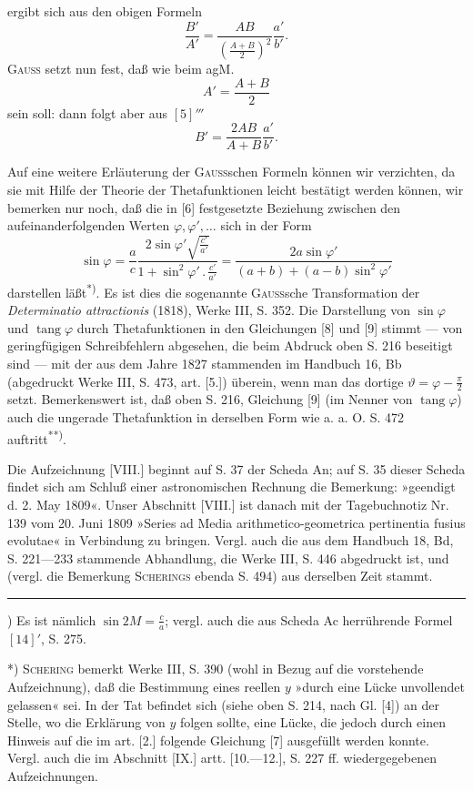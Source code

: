\noindent ergibt sich aus den obigen Formeln
\begin{equation*}\tag*{$[5]'''$}\frac{B'}{A'}=\frac{AB}{\left(\frac{A+B}2\right)^2}\frac{a'}{b'}.\end{equation*}
\noindent \textsc{Gauss} setzt nun fest, daß wie beim agM.
\[A'=\frac{A+B}2\]
\noindent sein soll: dann folgt aber aus $[5]'''$
\[B'=\frac{2AB}{A+B}\frac{a'}{b'}.\]
\par\indent Auf eine weitere Erläuterung der \textsc{Gauss}schen Formeln können wir verzichten, da sie mit Hilfe der Theorie der Thetafunktionen leicht bestätigt werden können, wir bemerken nur noch, daß die in [6] festgesetzte Beziehung zwischen den aufeinanderfolgenden Werten $\varphi,\varphi',\ldots$ sich in der Form
\begin{equation*}\tag*{$[6]'$}
\sin\varphi=\frac ac\frac{2\sin\varphi'\sqrt{\frac{c'}{a'}}}{1+\sin^2\varphi'\,.\,\frac{c'}{a'}}=\frac{2a\sin\varphi'}{(a+b)+(a-b)\sin^2\varphi'}
\end{equation*}
\noindent darstellen läßt\textsuperscript{*)}. Es ist dies die sogenannte \textsc{Gauss}sche Transformation der \textit{Determinatio attractionis} (1818), Werke III, S. 352. Die Darstellung von $\sin\varphi$ und $\operatorname{tang}\varphi$ durch Thetafunktionen in den Gleichungen [8] und [9] stimmt — von geringfügigen Schreibfehlern abgesehen, die beim Abdruck oben S. 216 beseitigt sind — mit der aus dem Jahre 1827 stammenden im Handbuch 16, Bb (abgedruckt Werke III, S. 473, art. [5.]) überein, wenn man das dortige $\vartheta=\varphi-\frac\pi2$ setzt. Bemerkenswert ist, daß oben S. 216, Gleichung [9] (im Nenner von $\operatorname{tang}\varphi$) auch die ungerade Thetafunktion in derselben Form wie a. a. O. S. 472 auftritt\textsuperscript{**)}.
\par\indent Die Aufzeichnung [VIII.] beginnt auf S. 37 der Scheda An; auf S. 35 dieser Scheda findet sich am Schluß einer astronomischen Rechnung die Bemerkung: »geendigt d. 2. May 1809«. Unser Abschnitt [VIII.] ist danach mit der Tagebuchnotiz Nr. 139 vom 20. Juni 1809 »Series ad Media arithmetico-geometrica pertinentia fusius evolutae« in Verbindung zu bringen. Vergl. auch die aus dem Handbuch 18, Bd, S. 221—233 stammende Abhandlung, die Werke III, S. 446 abgedruckt ist, und (vergl. die Bemerkung \textsc{Scherings} ebenda S. 494) aus derselben Zeit stammt.
\par\smallskip\noindent\rule{.25\linewidth}{.4pt}\par
{\small
\par\indent *) Es ist nämlich $\sin2M=\frac ca$; vergl. auch die aus Scheda Ac herrührende Formel $[14]'$, S. 275.
\par\indent **) \textsc{Schering} bemerkt Werke III, S. 390 (wohl in Bezug auf die vorstehende Aufzeichnung), daß die Bestimmung eines reellen $y$ »durch eine Lücke unvollendet gelassen« sei. In der Tat befindet sich (siehe oben S. 214, nach Gl. [4]) an der Stelle, wo die Erklärung von $y$ folgen sollte, eine Lücke, die jedoch durch einen Hinweis auf die im art. [2.] folgende Gleichung [7] ausgefüllt werden konnte. Vergl. auch die im Abschnitt [IX.] artt. [10.—12.], S. 227 ff. wiedergegebenen Aufzeichnungen.
\par}
\clearpage
\endgroup
